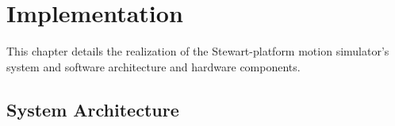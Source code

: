 \documentclass{article}
\begin{document}
\section{Implementation}
This chapter details the realization of the Stewart-platform motion simulator’s system and 
software architecture and hardware components.
\subsection{System Architecture}
\end{document}
